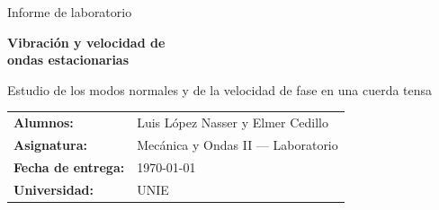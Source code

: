 \documentclass[12pt,a4paper]{article}
\begin{document}
\begin{titlepage}
  \centering
  \vspace*{2cm}
  {\large Informe de laboratorio\par}
  \vspace{0.5cm}
  {\LARGE \textbf{Vibración y velocidad de\\[4pt] ondas estacionarias}\par}
  \vspace{0.8cm}
  {\normalsize Estudio de los modos normales y de la velocidad de fase en una cuerda tensa\par}
  \vspace{1.2cm}
  \begin{tabular}{>{\bfseries}p{4cm} p{8cm}}
    Alumnos:          & Luis López Nasser y Elmer Cedillo \\
    Asignatura:       & Mecánica y Ondas II --- Laboratorio \\
    Fecha de entrega: & \today \\
    Universidad:      & UNIE \\
  \end{tabular}
  \vfill
\end{titlepage}

\tableofcontents
\clearpage
\end{document}
